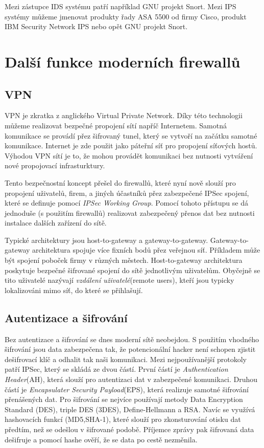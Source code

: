 \documentclass[11pt,twoside,a4paper]{article}
\begin{document}
Mezi zástupce IDS systému patří například GNU projekt Snort. Mezi IPS systémy můžeme jmenovat produkty řady ASA 5500 od firmy Cisco, produkt IBM Security Network IPS nebo opět GNU projekt Snort. 

\section{Další funkce moderních firewallů}
\subsection{VPN}
VPN je zkratka z anglického Virtual Private Network. Díky této technologii můžeme realizovat bezpečné propojení sítí napříč Internetem. Samotná komunikace se provádí přez šifrovaný tunel, který se vytvoří na začátku samotné komunikace. Internet je zde použit jako páteřní síť pro propojení síťových hostů. Výhodou VPN sítí je to, že mohou provádět komunikaci bez nutnosti vytváření nové propojovací infrasturktury.

Tento bezpečnostní koncept přešel do firewallů, které nyní nově slouží pro propojení uživatelů, firem, a jiných účastníků přez zabezpečené IPSec spojení, které se definuje pomocí \textit{IPSec Working Group}. Pomocí tohoto přístupu se dá jednoduše (s použitím firewallů) realizovat zabezpečený přenos dat bez nutnosti instalace dalších zařízení do sítě.

Typické architektury jsou host-to-gateway a gateway-to-gateway. Gateway-to-gateway architektura spojuje více fixních bodů přez veřejnou síť. Příkladem může být spojení poboček firmy v různých městech. Host-to-gateway architektura poskytuje bezpečné šifrované spojení do sítě jednotlivým uživatelům. Obyčejně se tito uživatelé nazývají \textit{vzdálení uživatelé}(remote users), kteří jsou typicky lokalizováni mimo síť, do které se přihlašují.

\subsection{Autentizace a šifrování}
Bez autentizace a šifrování se dnes moderní sítě neobejdou. S použitím vhodného šifrování jsou data zabezpečena tak, že potencionální hacker není schopen zjistit dešifrovací klíč a odhalit tak naši komunikaci. Mezi nejpoužívanější protokoly patří IPSec, který se skládá ze dvou částí. První částí je \textit{Authentication Header}(AH), která slouží pro autentizaci dat v zabezpečené komunikaci. Druhou částí je \textit{Encapsulater Security Payload}(EPS), která realizuje samotné šifrování přenášených dat. Pro šifrování se nejvíce používají metody Data Encryption Standard (DES), triple DES (3DES), Define-Hellmann a RSA. Navíc se využívá hashovacích funkcí (MD5,SHA-1), které slouží pro zkonsturování otisku dat předtím, než se odešlou v šifrované podobě. Příjemce zprávy pak šifrovaná data dešifruje a pomocí hashe ověří, že se data po cestě nezměnila.
\end{document}
